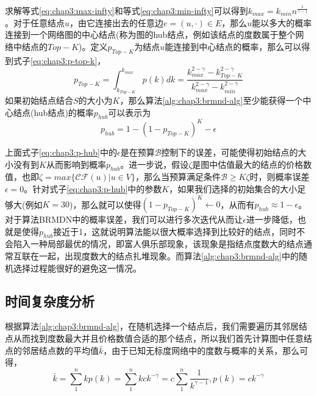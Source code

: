 求解等式\ref{eq:chap3:max-infty}和等式\ref{eq:chap3:min-infty}可以得到$k_{max} = k_{min}n^{\frac{1}{\gamma-1}}$。对于任意结点$u$，由它连接出去的任意边$e=(u, \cdot) \in E$，那么$u$能以多大的概率连接到一个网络图的中心结点(称为图的hub结点，例如该结点的度数属于整个网络中结点的$Top-K$)。定义$p_{Top-K}$为结点$u$能连接到中心结点的概率，那么可以得到式子\ref{eq:chap3:p-top-k}，
\begin{equation}
\label{eq:chap3:p-top-k}
p_{Top-K} = \int_{k_{Top-K}}^{k_{max}}p(k)dk = \frac{k_{max}^{2-\gamma} - k_{Top-K}^{2-\gamma}}{k_{max}^{2-\gamma} - k_{min}^{2-\gamma}}
\end{equation}
如果初始结点结合$S$的大小为$K$，那么算法\ref{alg:chap3:brmnd-alg}至少能获得一个中心结点(hub结点)的概率$p_{hub}$可以表示为
\begin{equation}
\label{eq:chap3:p-hub}
p_{hub} = 1 - (1-p_{Top-K})^{K} - \epsilon
\end{equation}


上面式子\ref{eq:chap3:p-hub}中的$\epsilon$是在预算$\mathcal{B}$控制下的误差，可能使得初始结点的大小没有到$K$从而影响到概率$p_{hub}$。进一步说，假设$\zeta$是图中估值最大的结点的价格数值，也即$\zeta = max \{\mathcal{CF}(u) | u \in V\}$，那么当预算满足条件$\mathcal{B} \geq K\zeta$时，则概率误差$\epsilon = 0$。针对式子\ref{eq:chap3:p-hub}中的参数$K$，如果我们选择的初始集合的大小足够大(例如$K=30$)，那么就可以使得$(1-p_{Top-K})^{K} \leftarrow 0$，从而有$p_{hub} \approx 1 - \epsilon$。对于算法BRMDN中的概率误差，我们可以进行多次迭代从而让$\epsilon$进一步降低，也就是使得$p_{hub}$接近于1，这就说明算法能以很大概率选择到比较好的结点，同时不会陷入一种局部最优的情况，即富人俱乐部现象\cite{zhou2004rich}，该现象是指结点度数大的结点通常互联在一起，出现度数大的结点扎堆现象。而算法\ref{alg:chap3:brmnd-alg}中的随机选择过程能很好的避免这一情况。


\subsection{时间复杂度分析}
根据算法\ref{alg:chap3:brmnd-alg}，在随机选择一个结点后，我们需要遍历其邻居结点从而找到度数最大并且价格数值合适的那个结点，所以我们首先计算图中任意结点的邻居结点数的平均值$\bar{k}$，由于已知无标度网络中的度数与概率的关系，那么可得，
\begin{equation}
\bar{k} = \sum_{1}^{n} kp(k) = \sum_{1}^{n}kck^{-\gamma} = c\sum_{1}^{n}\frac{1}{k^{\gamma-1}},p(k)=ck^{-\gamma}
\end{equation}


